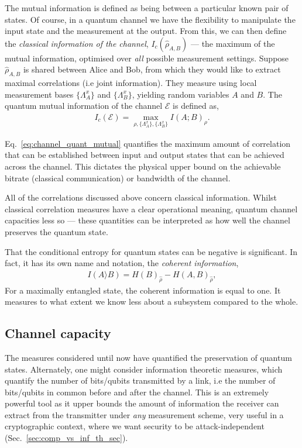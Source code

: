 The mutual information is defined as being between a particular known pair of states. Of course, in a quantum channel we have the flexibility to manipulate the input state and the measurement at the output. From this, we can then define the \textit{classical information of the channel}, $I_c(\hat\rho_{A,B})$ --- the maximum of the mutual information, optimised over \textit{all} possible measurement settings. Suppose $\hat\rho_{A,B}$ is shared between Alice and Bob, from which they would like to extract maximal correlations (i.e joint information). They measure using local measurement bases $\{\Lambda_A^x\}$ and $\{\Lambda_B^x\}$, yielding random variables $A$ and $B$. The quantum mutual information of the channel $\mathcal{E}$ is defined as,
\begin{align} \label{eq:channel_quant_mutual}
I_c(\mathcal{E}) = \max_{\rho,\{\Lambda_A^x\},\{\Lambda_B^x\}} I(A;B)_\rho. 
\end{align}

Eq.~\eqref{eq:channel_quant_mutual} quantifies the maximum amount of correlation that can be established between input and output states that can be achieved across the channel. This dictates the physical upper bound on the achievable bitrate (classical communication) or bandwidth of the channel.

All of the correlations discussed above concern classical information. Whilst classical correlation measures have a clear operational meaning, quantum channel capacities less so --- these quantities can be interpreted as how well the channel preserves the quantum state.

That the conditional entropy for quantum states can be negative is significant. In fact, it has its own name and notation, the \textit{coherent information},
\begin{align}
I(A\rangle B) = H(B)_{\hat\rho} - H(A,B)_{\hat\rho},
\end{align}
For a maximally entangled state, the coherent information is equal to one. It measures to what extent we know less about a subsystem compared to the whole.

%
%

\subsection{Channel capacity} \label{sec:channel_cap} 

The measures considered until now have quantified the preservation of quantum states. Alternately, one might consider information theoretic measures, which quantify the number of bits/qubits transmitted by a link, i.e the number of bits/qubits in common before and after the channel. This is an extremely powerful tool as it upper bounds the amount of information the receiver can extract from the transmitter under \textit{any} measurement scheme, very useful in a cryptographic context, where we want security to be attack-independent (Sec.~\ref{sec:comp_vs_inf_th_sec}). 



